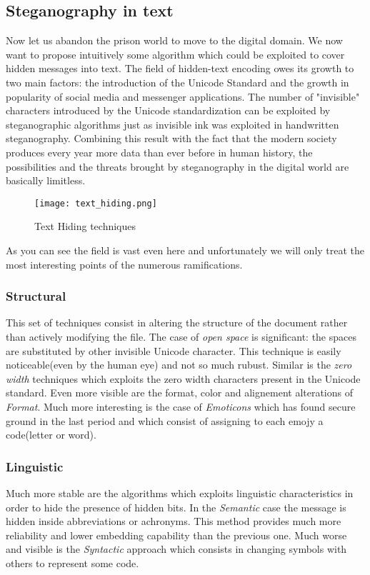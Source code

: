 \documentclass[../../main.tex]{subfiles}
\begin{document}
\subsection{Steganography in text}
Now let us abandon the prison world to move to the digital domain.
We now want to propose intuitively some algorithm which could be exploited
to cover hidden messages into text.
The field of hidden-text encoding owes its growth to two main factors: the
introduction of the Unicode Standard and the growth in popularity of social
media and messenger applications.
The number of "invisible" characters introduced by the Unicode
standardization can be exploited by steganographic algorithms just as
invisible ink was exploited in handwritten steganography.
Combining this result with the fact that the modern society produces every
year more data than ever before in human history, the possibilities and the
threats brought by steganography in the digital world are basically
limitless.

\begin{figure}[h]
    \centering
    \caption{Text Hiding techniques}
    \texttt{[image: text\_hiding.png]}
\end{figure}

As you can see the field is vast even here and unfortunately we will only
treat the most interesting points of the numerous ramifications.

\subsubsection{Structural}
This set of techniques consist in altering the structure of the document
rather than actively modifying the file. The case of \emph{open space} is
significant: the spaces are substituted by other invisible Unicode
character.
This technique is easily noticeable(even by the human eye) and not so much
rubust.
Similar is the \emph{zero width} techniques which exploits the zero width
characters present in the Unicode standard.
Even more visible are the format, color and alignement alterations of
\emph{Format}.
Much more interesting is the case of \emph{Emoticons} which has found secure
ground in the last period and which consist of assigning to each emojy a
code(letter or word).

\subsubsection{Linguistic}
Much more stable are the algorithms which exploits linguistic
characteristics in order to hide the presence of hidden bits.
In the \emph{Semantic} case the message is hidden inside abbreviations or
achronyms.
This method provides much more reliability and lower embedding capability
than the previous one.
Much worse and visible is the \emph{Syntactic} approach which consists in
changing symbols with others to represent some code.
\end{document}
